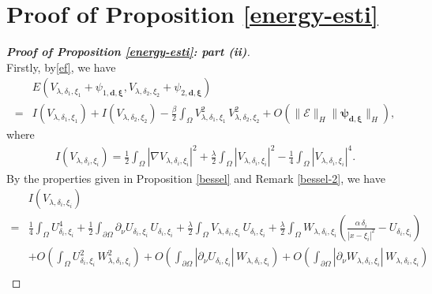 \documentclass[a4paper,reqno,11pt,oneside]{amsart}
\numberwithin{equation}{section}
\renewcommand{\theequation}{\arabic{section}.\arabic{equation}}
\begin{document}
\vspace{0.2cm}
\section{Proof of  Proposition \ref{energy-esti}} \label{appC}
\setcounter{equation}{0}
\renewcommand{\theequation}{C.\arabic{equation}}

\begin{proof}[\textbf{Proof of Proposition \eqref{energy-esti}: part (ii)}]${}$\\

Firstly, by\eqref{ef}, we have 
\begin{align}\label{new-eff}
&E\left(V_{\lambda,\delta_1,\xi_1}+\psi_{1,{\bm{d},\bm{\xi}}},V_{\lambda,\delta_2,\xi_2}+\psi_{2,{\bm{d},\bm{\xi}}}\right)\nonumber\\=&I\left(V_{\lambda,\delta_1,\xi_1}\right)+I\left(V_{\lambda,\delta_2,\xi_2}\right)-\frac{\beta}{2}\displaystyle\int_{\Omega}V_{\lambda,\delta_1,\xi_1}^2\,V_{\lambda,\delta_2,\xi_2}^2+O\left(\|\bm{\mathcal{E}}\|_{H}\|\bm{\psi}_{{{\bm{d},\bm{\xi}}}}\|_{H}\right),
\end{align}
where \begin{align*}
I\left(V_{\lambda,\delta_i,\xi_i}\right)
=\frac{1}{2}\displaystyle\int_{\Omega} \left|\nabla V_{\lambda,\delta_i,\xi_i}\right|^2
+ \frac{\lambda}{2}\displaystyle\int_{\Omega} \left|V_{\lambda,\delta_i,\xi_i}\right|^2
- \frac{1}{4} \displaystyle\int_{\Omega}\left|V_{\lambda,\delta_i,\xi_i}\right|^4.
\end{align*}
 By the properties given in Proposition \ref{bessel} and Remark \ref{bessel-2}, we have
\begin{align}\label{enery-expansion}
&I\left(V_{\lambda,\delta_i,\xi_i}\right)\nonumber\\=&\frac{1}{4} \displaystyle\int_{\Omega}U_{\delta_i,\xi_i}^4+\frac{1}{2}\displaystyle\int_{\partial\Omega}\partial_{\nu}U_{\delta_i,\xi_i} \,U_{\delta_i,\xi_i}+\frac{\lambda}{2}\displaystyle\int_{\Omega}V_{\lambda,\delta_i,\xi_i}\,U_{\delta_i,\xi_i}+\frac{\lambda}{2}\displaystyle\int_{\Omega}W_{\lambda,\delta_i,\xi_i}\left(\frac{\alpha\,\delta_i}{|x-\xi_i|^2}- U_{\delta_i,\xi_i}\right) \nonumber\\
&+O\left(\displaystyle\int_{\Omega}U_{\delta_i,\xi_i}^2\,W_{\lambda,\delta_i,\xi_i}^2\right)+O\left(\displaystyle\int_{\partial\Omega}\left|\partial_{\nu}U_{\delta_i,\xi_i}\right|\,W_{\lambda,\delta_i,\xi_i}\right)+O\left(\displaystyle\int_{\partial\Omega}\left|\partial_{\nu}W_{\lambda,\delta_i,\xi_i}\right|\,W_{\lambda,\delta_i,\xi_i}\right)\nonumber\\

\end{align}
\end{proof}
\end{document}
